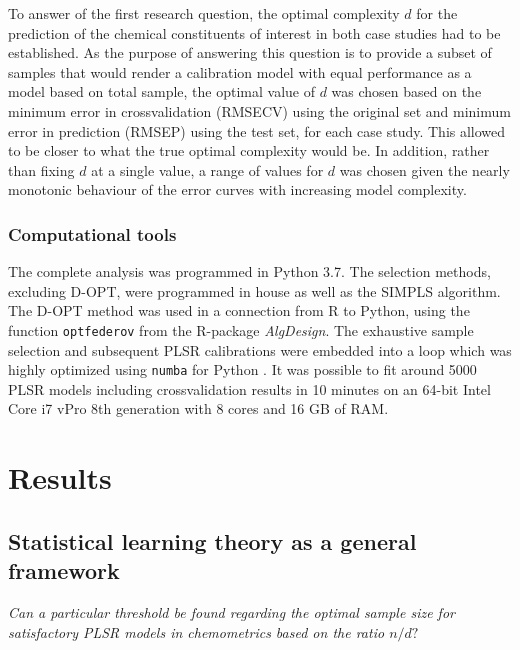 \documentclass[journal=ancham,manuscript=article]{achemso}
\begin{document}
To answer of the first research question, the optimal complexity $d$ for the prediction of the chemical constituents of interest in both case studies had
to be established. As the purpose of answering this question is to provide a subset of samples that would render a calibration model with equal performance as a model based on total sample, the optimal value of $d$ was chosen based on the minimum error in crossvalidation (RMSECV) using the original set and minimum error in prediction (RMSEP) using the test set, for each case study. This allowed to be closer to what the true optimal complexity would be. In addition, rather than fixing $d$ at a single value, a range of values for $d$ was chosen given the nearly monotonic behaviour of the error curves with increasing model complexity. 

\subsubsection{Computational tools}

The complete analysis was programmed in Python 3.7. The selection methods, excluding D-OPT, were programmed in house as well as the SIMPLS algorithm. The D-OPT method was used in a connection from R to Python, using the function \texttt{optfederov} from the R-package \emph{AlgDesign}\cite{Wheeler2019}. The exhaustive sample selection and subsequent PLSR calibrations were embedded into a loop which was highly optimized using \texttt{numba} for Python \cite{Lam2015}. It was possible to fit around 5000 PLSR models including crossvalidation results in 10 minutes on an 64-bit Intel Core i7 vPro 8th generation with 8 cores and 16 GB of RAM. 



\section{Results}\label{results}

\subsection{Statistical learning theory as a general framework}\label{results:genframework}

\emph{Can a particular threshold be found regarding the optimal sample size for satisfactory PLSR models in chemometrics based on the ratio $n/d?$}
\end{document}
